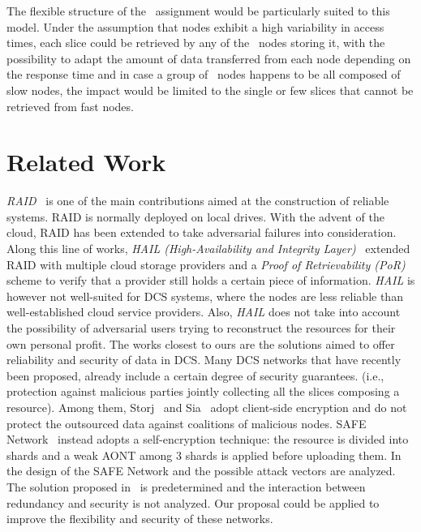   The flexible structure of the \compact\ assignment would be
  particularly suited to this model. Under the assumption that nodes
  exhibit a high variability in access times, each slice could be
  retrieved by any of the \R\ nodes storing it, with the possibility
  to adapt the amount of data transferred from each node depending on
  the response time and in case a group of \R\ nodes happens to be all
  composed of slow nodes, the impact would be limited to the single or
  few slices that cannot be retrieved from fast nodes.



\section{Related Work}\label{dcs:sec:relwork}


{\em RAID}~\cite{Patterson:1988:CRA:971701.50214} is one of the main
contributions aimed at the construction of reliable systems.  RAID is
normally deployed on local drives.  With the advent of the cloud, RAID
has been extended to take adversarial failures into
consideration. Along this line of works, {\em HAIL (High-Availability
  and Integrity Layer)}~\cite{bowers2009hail} extended RAID with
multiple cloud storage providers and a {\em Proof of Retrievability
  (PoR)}~\cite{bowers2009proofs} scheme to verify that a provider
still holds a certain piece of information.  {\em HAIL} is however not
well-suited for DCS systems, where the nodes are less reliable than
well-established cloud service providers. Also, {\em HAIL} does not
take into account the possibility of adversarial users trying to
reconstruct the resources for their own personal profit.  The works
closest to ours are the solutions aimed to offer reliability and
security of data in DCS. Many DCS networks that have recently been
proposed, already include a certain degree of security guarantees.
(i.e., protection against malicious parties jointly collecting all the
slices composing a resource).  Among them,
Storj~\cite{wilkinson2014storj} and Sia~\cite{vorick2014sia} adopt
client-side encryption and do not protect the outsourced data against
coalitions of malicious nodes.  SAFE Network~\cite{irvine2010maidsafe}
instead adopts a self-encryption technique: the resource is divided
into shards and a weak AONT among 3 shards is applied before uploading
them.  In~\cite{paul2014security} the design of the SAFE Network and
the possible attack vectors are analyzed.  The solution proposed
in~\cite{irvine2010maidsafe,paul2014security} is predetermined and the
interaction between redundancy and security is not analyzed.  Our
proposal could be applied to improve the flexibility and security of
these networks.



